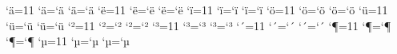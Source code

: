 %
%
%
%
%
%
%
%
%
% 
%
\begingroup
\catcode`^^e4=11 \uccode`^^e4=`^^e4	\lccode`^^e4=`^^e4 %
\catcode`^^eb=11 \uccode`^^eb=`^^eb	\lccode`^^eb=`^^eb %
\catcode`^^ef=11 \uccode`^^ef=`^^ef	\lccode`^^ef=`^^ef %
\catcode`^^f6=11 \uccode`^^f6=`^^f6	\lccode`^^f6=`^^f6 %
\catcode`^^fc=11 \uccode`^^fc=`^^fc	\lccode`^^fc=`^^fc %
\catcode`^^b2=11 \uccode`^^b2=`^^b2	\lccode`^^b2=`^^b2 %
\catcode`^^b3=11 \uccode`^^b3=`^^b3	\lccode`^^b3=`^^b3 %
\catcode`^^b4=11 \uccode`^^b4=`^^b4	\lccode`^^b4=`^^b4 %
\catcode`^^b6=11 \uccode`^^b6=`^^b6	\lccode`^^b6=`^^b6 %
\catcode`^^b5=11 \uccode`^^b5=`^^b5	\lccode`^^b5=`^^b5 %
